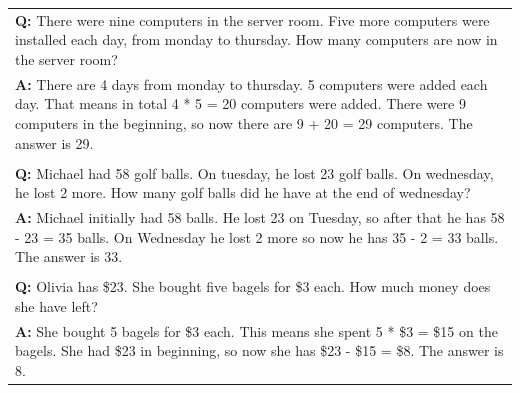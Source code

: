 \begin{table}[h]
\begin{tabularx}{\columnwidth}{@{}X@{}}
        \textbf{Q:} There were nine computers in the server room. Five more computers were installed each day, from monday to thursday. How many computers are now in the server room? \\
        \textbf{A:} There are 4 days from monday to thursday. 5 computers were added each day. That means in total 4 * 5 = 20 computers were added. There were 9 computers in the beginning, so now there are 9 + 20 = 29 computers. The answer is 29. \\\\
        \textbf{Q:} Michael had 58 golf balls. On tuesday, he lost 23 golf balls. On wednesday, he lost 2 more. How many golf balls did he have at the end of wednesday? \\
        \textbf{A:} Michael initially had 58 balls. He lost 23 on Tuesday, so after that he has 58 - 23 = 35 balls. On Wednesday he lost 2 more so now he has 35 - 2 = 33 balls. The answer is 33. \\\\
        \textbf{Q:} Olivia has \$23. She bought five bagels for \$3 each. How much money does she have left? \\
        \textbf{A:} She bought 5 bagels for \$3 each. This means she spent 5 * \$3 = \$15 on the bagels. She had \$23 in beginning, so now she has \$23 - \$15 = \$8. The answer is 8. \\
        \bottomrule
    \end{tabularx}
\end{table}

